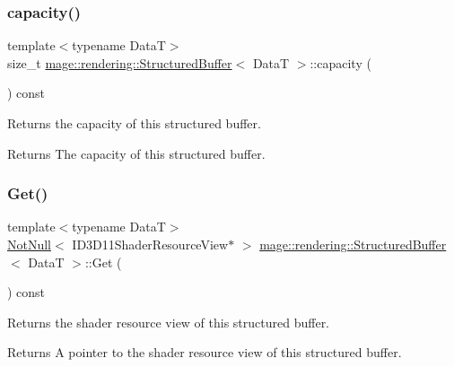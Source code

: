 \subsubsection{\texorpdfstring{capacity()}{capacity()}}
{\footnotesize\ttfamily template$<$typename DataT$>$ \\
size\+\_\+t \hyperlink{classmage_1_1rendering_1_1_structured_buffer}{mage\+::rendering\+::\+Structured\+Buffer}$<$ DataT $>$\+::capacity (\begin{DoxyParamCaption}{ }\end{DoxyParamCaption}) const\hspace{0.3cm}{\ttfamily [noexcept]}}

Returns the capacity of this structured buffer.

\begin{DoxyReturn}{Returns}
The capacity of this structured buffer. 
\end{DoxyReturn}
\hypertarget{classmage_1_1rendering_1_1_structured_buffer_a7a2203f9542ac15f0053053d694d906c}{}\label{classmage_1_1rendering_1_1_structured_buffer_a7a2203f9542ac15f0053053d694d906c} 
\subsubsection{\texorpdfstring{Get()}{Get()}}
{\footnotesize\ttfamily template$<$typename DataT$>$ \\
\hyperlink{namespacemage_a8769f9d670d6b585ea306cb1062af94b}{Not\+Null}$<$ I\+D3\+D11\+Shader\+Resource\+View$\ast$ $>$ \hyperlink{classmage_1_1rendering_1_1_structured_buffer}{mage\+::rendering\+::\+Structured\+Buffer}$<$ DataT $>$\+::Get (\begin{DoxyParamCaption}{ }\end{DoxyParamCaption}) const\hspace{0.3cm}{\ttfamily [noexcept]}}

Returns the shader resource view of this structured buffer.

\begin{DoxyReturn}{Returns}
A pointer to the shader resource view of this structured buffer. 
\end{DoxyReturn}
\hypertarget{classmage_1_1rendering_1_1_structured_buffer_a87a27778bf6097f84b63acc0eef49a3a}{}\label{classmage_1_1rendering_1_1_structured_buffer_a87a27778bf6097f84b63acc0eef49a3a} 
